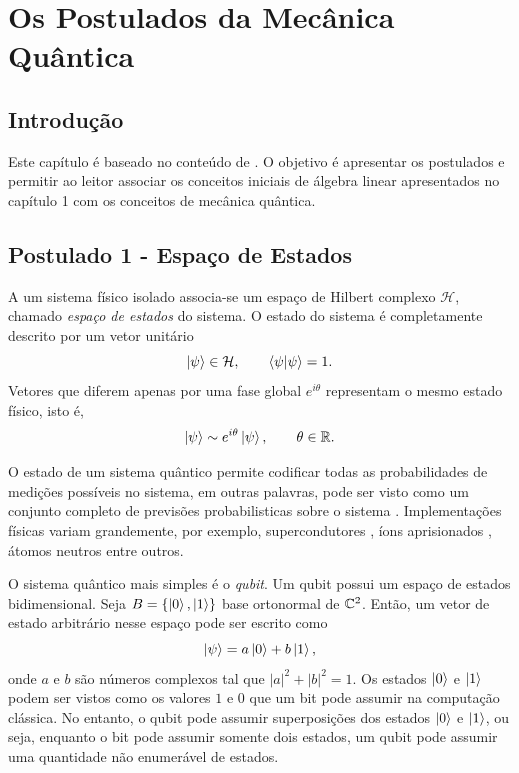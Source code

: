 
\chapter[Os Postulados da Mecânica Quântica]{Os Postulados da Mecânica Quântica}
\label{chap:postulados}

\section{Introdução}

Este capítulo é baseado no conteúdo de \cite[seção ~2.2]{nielsen2010quantum}. O objetivo é apresentar os postulados e permitir ao leitor associar os conceitos iniciais de álgebra linear apresentados no capítulo 1 com os conceitos de mecânica quântica.

\section{Postulado 1 - Espaço de Estados}

A um sistema físico isolado associa-se um espaço de Hilbert complexo $\mathcal{H}$, chamado
\emph{espaço de estados} do sistema. O estado do sistema é completamente descrito por um vetor unitário
$$
\ket{\psi} \in \mathcal{H},
\qquad \langle \psi | \psi \rangle = 1.
$$
Vetores que diferem apenas por uma fase global $e^{i\theta}$ representam o mesmo estado físico,
isto é,
\begin{equation}\label{eq:gf}
\ket{\psi} \sim e^{i\theta}\ket{\psi}, \qquad \theta \in \mathbb{R}.
\end{equation}

O estado de um sistema quântico permite codificar todas as probabilidades de medições possíveis no sistema, em outras palavras, pode ser visto como um conjunto completo de previsões probabilisticas sobre o sistema \cite{ibmqsv2026}. Implementações físicas variam grandemente, por exemplo, supercondutores \cite{10.1063/5.0082975}, íons aprisionados \cite{Bruzewicz_2019}, átomos neutros \cite{Henriet_2020} entre outros.

O sistema quântico mais simples é o \emph{qubit}. Um qubit possui um espaço de estados bidimensional. Seja $B=\{\ket{0}, \ket{1}\}$ base ortonormal de $\mathbb{C}^2$. Então, um vetor de estado arbitrário nesse espaço pode ser escrito como
\begin{equation}
\ket{\psi} = a \ket{0} + b \ket{1},
\end{equation}
onde $a$ e $b$ são números complexos tal que $|a|^2+|b|^2=1$. Os estados $\ket{0}$ e $\ket{1}$ podem ser vistos como os valores $1$ e $0$ que um bit pode assumir na computação clássica. No entanto, o qubit pode assumir superposições dos estados $\ket{0}$ e $\ket{1}$, ou seja, enquanto o bit pode assumir somente dois estados, um qubit pode assumir uma quantidade não enumerável de estados.

